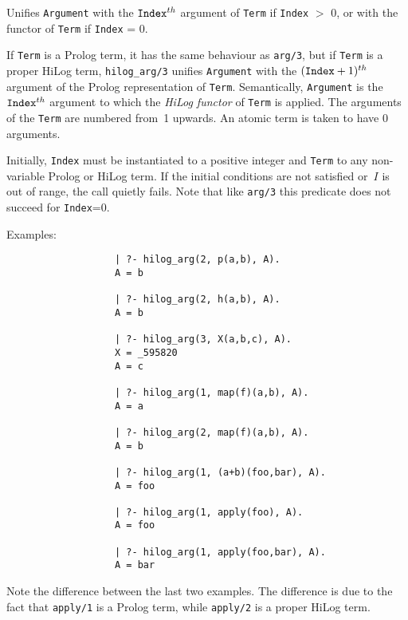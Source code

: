 \begin{description}
    Unifies {\tt Argument} with the ${\tt Index}^{th}$ argument of {\tt Term}
    if {\tt Index} $>$ 0, or with the functor of {\tt Term} if {\tt Index} = 0.

    If {\tt Term} is a Prolog term, it has the same behaviour as {\tt arg/3},
    but if {\tt Term} is a proper HiLog term, {\tt hilog\_arg/3} unifies 
    {\tt Argument} with the 
    $({\tt Index}+1)^{th}$ argument of the Prolog representation of 
    {\tt Term}\@.  Semantically, {\tt Argument} is the ${\tt Index}^{th}$ 
    argument to which the {\em HiLog functor} of {\tt Term} is applied.
    The arguments of the {\tt Term} are numbered from~1 upwards. An atomic term 
    is taken to have $0$ arguments.  
    
    Initially, {\tt Index} must be instantiated to a positive integer and 
    {\tt Term} to any non-variable Prolog or HiLog term.
    If the initial conditions are not satisfied or~$I$ is 
    out of range, the call quietly fails. Note that like {\tt arg/3}
    this predicate does not succeed for {\tt Index}=0.

    Examples:
    {\footnotesize
     \begin{verbatim}
                   | ?- hilog_arg(2, p(a,b), A).
                   A = b

                   | ?- hilog_arg(2, h(a,b), A).
                   A = b

                   | ?- hilog_arg(3, X(a,b,c), A).
                   X = _595820
                   A = c

                   | ?- hilog_arg(1, map(f)(a,b), A).
                   A = a

                   | ?- hilog_arg(2, map(f)(a,b), A).
                   A = b

                   | ?- hilog_arg(1, (a+b)(foo,bar), A).
                   A = foo

                   | ?- hilog_arg(1, apply(foo), A). 
                   A = foo

                   | ?- hilog_arg(1, apply(foo,bar), A).
                   A = bar
     \end{verbatim}}

    Note the difference between the last two examples. The difference is 
    due to the fact that {\tt apply/1} is a Prolog term, while 
    {\tt apply/2} is a proper HiLog term.


\end{description}
